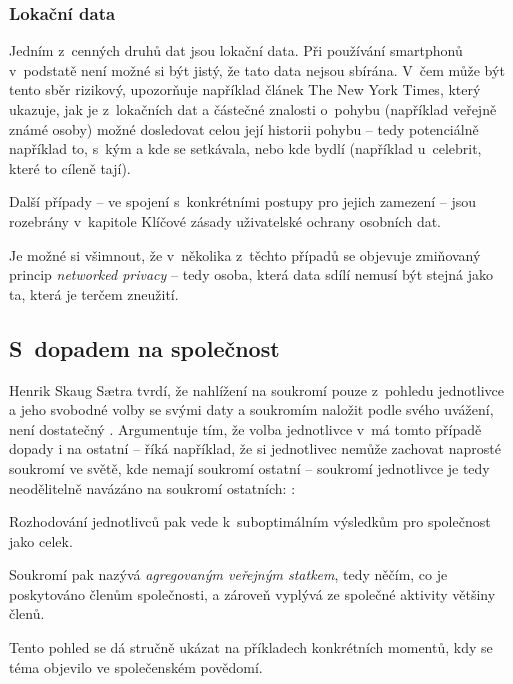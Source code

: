 \subsubsection*{Lokační data}
Jedním z~cenných druhů dat jsou lokační data. Při používání smartphonů v~podstatě není možné si být jistý, že tato data nejsou sbírána. V~čem může být tento sběr rizikový, upozorňuje například článek The New York Times\citep{location-data}, který ukazuje, jak je z~lokačních dat a částečné znalosti o~pohybu (například veřejně známé osoby) možné dosledovat celou její historii pohybu -- tedy potenciálně například to, s~kým a kde se setkávala, nebo kde bydlí (například u~celebrit, které to cíleně tají).   

Další případy -- ve spojení s~konkrétními postupy pro jejich zamezení -- jsou rozebrány v~kapitole Klíčové zásady uživatelské ochrany osobních dat.

Je možné si všimnout, že v~několika z~těchto případů se objevuje zmiňovaný princip \textit{networked privacy} -- tedy osoba, která data sdílí nemusí být stejná jako ta, která je terčem zneužití.

\subsection{S~dopadem na společnost}
Henrik Skaug Sætra tvrdí, že nahlížení na soukromí pouze z~pohledu jednotlivce a jeho svobodné volby se svými daty a soukromím naložit podle svého uvážení, není dostatečný \citep{privacy-as-aggregate-public-good}. Argumentuje tím, že volba jednotlivce v~má tomto případě dopady i na ostatní -- říká například, že si jednotlivec nemůže zachovat naprosté soukromí ve světě, kde nemají soukromí ostatní -- soukromí jednotlivce je tedy neodělitelně navázáno na soukromí ostatních: 
:

\begin{displayquote}
	\citep{privacy-as-aggregate-public-good}
\end{displayquote}

Rozhodování jednotlivců pak vede k~suboptimálním výsledkům pro společnost jako celek.

Soukromí pak nazývá \textit{agregovaným veřejným statkem}, tedy něčím, co je poskytováno členům společnosti, a zároveň vyplývá ze společné aktivity většiny členů.

Tento pohled se dá stručně ukázat na příkladech konkrétních momentů, kdy se téma objevilo ve společenském povědomí.

